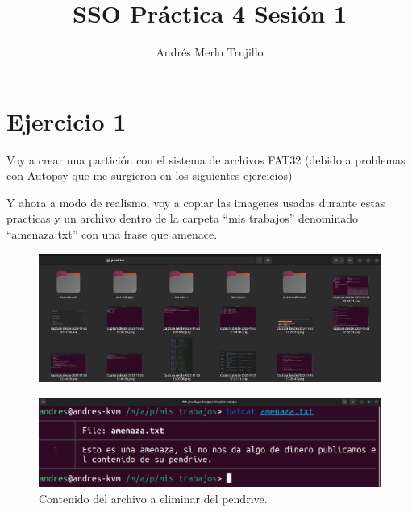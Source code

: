 \documentclass{article}
\title{SSO Práctica 4 Sesión 1}
\author{Andrés Merlo Trujillo}
\date{}
\begin{document}
\maketitle

\tableofcontents

\newpage

\section*{Ejercicio 1}

Voy a crear una partición con el sistema de archivos FAT32 (debido a problemas con Autopsy que me surgieron en los siguientes ejercicios)

Y ahora a modo de realismo, voy a copiar las imagenes usadas durante estas practicas y un archivo dentro de la carpeta ``mis trabajos'' denominado ``amenaza.txt'' con una frase que amenace.

\begin{figure}[H]
    \centering
    \includegraphics[width=\textwidth]{imagenes/Captura desde 2022-12-02 17-34-22.png}
\end{figure}

\begin{figure}[H]
    \centering
    \includegraphics[width=\textwidth]{imagenes/Captura desde 2022-12-02 17-35-50.png}
    \caption{Contenido del archivo a eliminar del pendrive.}
\end{figure}
\end{document}

